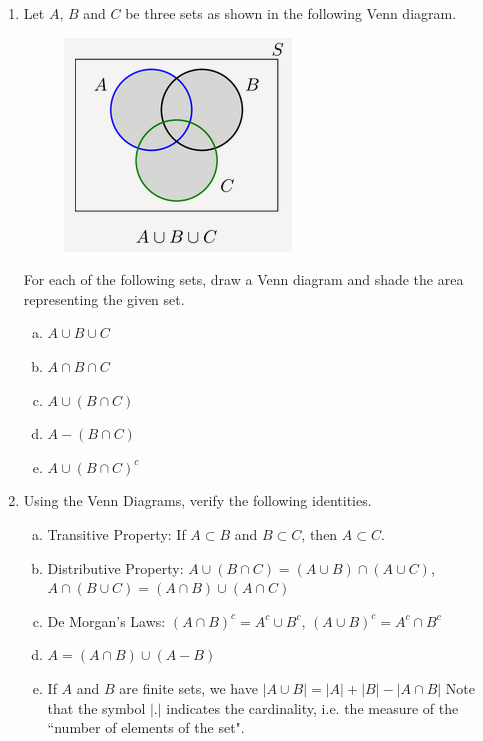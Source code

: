 \documentclass[12pt,thmsa]{article}
\begin{document}
\begin{enumerate}
\item Let $ A $, $ B $ and $ C $ be three sets as shown in the following Venn diagram.\\
\begin{figure}[h!]
\begin{center}
\includegraphics[scale=1]{Capture.png}
\end{center}
\end{figure}
\newline
For each of the following sets, draw a Venn diagram and shade the area representing the given set.
\begin{enumerate}[a)]
\item $ A \cup B \cup C $
\item $ A \cap B \cap C $
\item $ A \cup (B \cap C) $
\item $ A - (B \cap C) $
\item $ A \cup (B \cap C)^{c} $
\end{enumerate}


\item Using the Venn Diagrams, verify the following identities.
\begin{enumerate}[a)]
\item Transitive Property: If $A \subset B$ and $B \subset C$, then $A \subset C$. \\
\item Distributive Property: $A \cup (B \cap C) = (A \cup B) \cap (A \cup C)$, $A \cap (B \cup C) = (A \cap B) \cup (A \cap C) $ \\
\item De Morgan's Laws: $(A \cap B)^c = A^c \cup B^c $, $(A \cup B)^c = A^c \cap B^c $\\
\item $ A=(A \cap B) \cup (A-B) $
\item If $ A $ and $ B $ are finite sets, we have $ |A \cup B|=|A|+|B|-|A \cap B| $
\subitem Note that the symbol $ | . | $ indicates the cardinality, i.e. the measure of the ``number of elements of the set".
\end{enumerate}


\end{enumerate}
\end{document}
